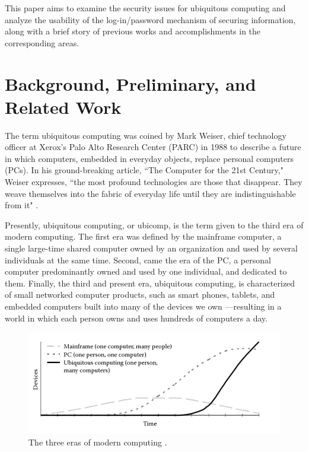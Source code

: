 \documentclass{article}
\begin{document}
This paper aims to examine the security issues for ubiquitous computing and analyze the usability of the log-in/password mechanism of securing information, along with a brief story of previous works and accomplishments in the corresponding areas. 

\section{Background, Preliminary, and Related Work}
The term ubiquitous computing was coined by Mark Weiser, chief technology officer at Xerox’s Palo Alto Research Center (PARC) in 1988 to describe a future in which computers, embedded in everyday objects, replace personal computers (PCs). In his ground-breaking article, ``The Computer for the 21st Century," Weiser expresses, ``the most profound technologies are those that disappear. They weave themselves into the fabric of everyday life until they are indistinguishable from it" \cite{weiser1991computer}.

Presently, ubiquitous computing, or ubicomp, is the term given to the third era of modern computing. The first era was defined by the mainframe computer, a single large-time shared computer owned by an organization and used by several individuals at the same time. Second, came the era of the PC, a personal computer predominantly owned and used by one individual, and dedicated to them. Finally, the third and present era, ubiquitous computing, is characterized of small networked computer products, such as smart phones, tablets, and embedded computers built into many of the devices we own ---resulting in a world in which each person owns and uses hundreds of computers a day.

\begin{figure}
  \centering
    \includegraphics[scale=0.7]{eras_modern_computing}
     \caption{The three eras of modern computing \cite{weiser1991computer}.}
\end{figure}
\end{document}
